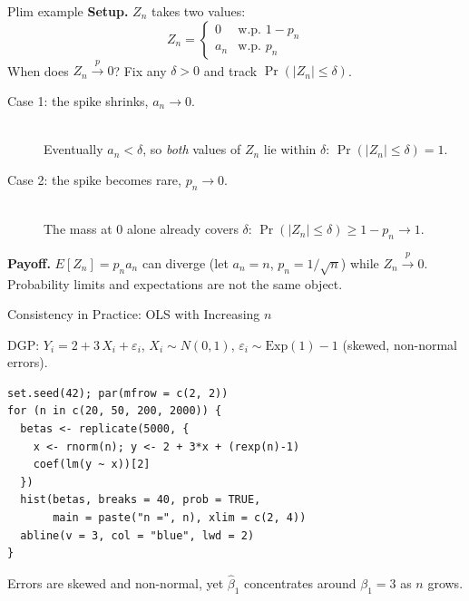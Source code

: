 \documentclass[handout, aspectratio=169]{beamer}
\numberwithin{equation}{section}
\begin{document}

\begin{frame}{Plim example}
\textbf{Setup.} $Z_n$ takes two values:
$$Z_n = \begin{cases} 0 & \text{w.p. } 1-p_n \\ a_n & \text{w.p. } p_n \end{cases}$$
When does $Z_n\overset{p}{\to}0$?  Fix any $\delta>0$ and track $\Pr(|Z_n|\leq\delta)$.\pause

\begin{description}
\item[Case 1: the spike shrinks, $a_n\to 0$.] \hfill\\
Eventually $a_n<\delta$, so \emph{both} values of $Z_n$ lie within $\delta$:
$\Pr(|Z_n|\leq\delta)=1$.\pause
\item[Case 2: the spike becomes rare, $p_n\to 0$.] \hfill\\
The mass at $0$ alone already covers $\delta$:
$\Pr(|Z_n|\leq\delta)\geq 1-p_n\to 1$.
\end{description}
\pause
\begin{tcolorbox}[colback=blue!5,colframe=structure]
\textbf{Payoff.} $E[Z_n]=p_n a_n$ can diverge (let $a_n=n$, $p_n=1/\sqrt{n}$) while $Z_n\overset{p}{\to}0$. Probability limits and expectations are not the same object.
\end{tcolorbox}
\end{frame}


\begin{frame}[fragile]{Consistency in Practice: OLS with Increasing $n$}

DGP: $Y_i = 2 + 3\,X_i + \varepsilon_i$, \quad $X_i \sim N(0,1)$, \quad $\varepsilon_i \sim \text{Exp}(1)-1$ (skewed, non-normal errors).

\begin{lstlisting}
set.seed(42); par(mfrow = c(2, 2))
for (n in c(20, 50, 200, 2000)) {
  betas <- replicate(5000, {
    x <- rnorm(n); y <- 2 + 3*x + (rexp(n)-1)
    coef(lm(y ~ x))[2]
  })
  hist(betas, breaks = 40, prob = TRUE,
       main = paste("n =", n), xlim = c(2, 4))
  abline(v = 3, col = "blue", lwd = 2)
}
\end{lstlisting}

Errors are skewed and non-normal, yet $\hat{\beta}_1$ concentrates around $\beta_1 = 3$ as $n$ grows.

\end{frame}
\end{document}

